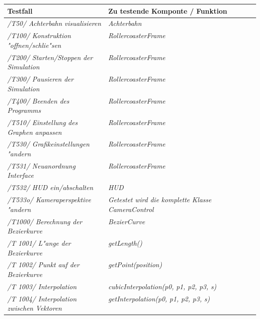 \begin{longtable}{|p{.3\linewidth}|p{0.6\linewidth}|}
Testfall & Zu testende Komponte / Funktion \\\hline

\textit{/T50/ Achterbahn visualisieren} & \textit{Achterbahn} \\\hline

\textit{/T100/ Konstruktion "offnen/schlie"sen} & \textit{RollercoasterFrame} \\\hline

\textit{/T200/ Starten/Stoppen der Simulation} & \textit{RollercoasterFrame} \\\hline

\textit{/T300/ Pausieren der Simulation} &  \textit{RollercoasterFrame}\\\hline

\textit{/T400/ Beenden des Programms} & \textit{RollercoasterFrame}\\\hline

\textit{/T510/ Einstellung des Graphen anpassen} &  \textit{RollercoasterFrame}\\\hline

\textit{ /T530/ Grafikeinstellungen "andern} &  \textit{RollercoasterFrame}\\\hline

\textit{/T531/ Neuanordnung Interface} &  \textit{RollercoasterFrame} \\\hline

\textit{/T532/ HUD ein/abschalten} & \textit{HUD}\\\hline

\textit{/T533o/ Kameraperspektive "andern} &  \textit{Getestet wird die komplette Klasse CameraControl}\\\hline

\textit{/T1000/ Berechnung der Bezierkurve}  &  \textit{BezierCurve}\\\hline

\textit{ /T 1001/ L"ange der Bezierkurve} &  \textit{getLength()}\\\hline

\textit{ /T 1002/ Punkt auf der Bezierkurve} &  \textit{getPoint(position)}\\\hline

\textit{ /T 1003/ Interpolation} &  \textit{cubicInterpolation(p0, p1, p2, p3, s)} \\\hline

\textit{ /T 1004/ Interpolation zwischen Vektoren} &  \textit{getInterpolation(p0, p1, p2, p3, s)}\\\hline


\end{longtable}

